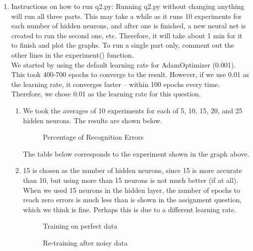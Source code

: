 \documentclass[11pt]{article}
\begin{document}
\begin{enumerate}
\pagebreak
\item Instructions on how to run q2.py:\newline
\newline
Running q2.py without changing anything will run all three parts. This may take a while as it runs 10 experiments for each number of hidden neurons, and after one is finished, a new neural net is created to run the second one, etc. Therefore, it will take about 1 min for it to finish and plot the graphs. To run a single part only, comment out the other lines in the experiment() function.\\
We started by using the default learning rate for AdamOptimizer (0.001). This took 400-700 epochs to converge to the result. However, if we use 0.01 as the learning rate, it converges faster -- within 100 epochs every time. Therefore, we chose 0.01 as the learning rate for this question.\\

% 
\begin{enumerate}
\item We took the averages of 10 experiments for each of 5, 10, 15, 20, and 25 hidden neurons. The results are shown below.\newline

\begin{figure}[h!]
    \centering
        \caption{Percentage of Recognition Errors}
\end{figure}

The table below corresponds to the experiment shown in the graph above.\newline
%

\item 15 is chosen as the number of hidden neurons, since 15 is more accurate than 10, but using more than 15 neurons is not much better (if at all). When we used 15 neurons in the hidden layer, the number of epochs to reach zero errors is much less than is shown in the assignment question, which we think is fine. Perhaps this is due to a different learning rate.\\
\begin{figure}[h!]
    \centering
    \begin{minipage}{0.45\textwidth}
    	\centering
        \caption{Training on perfect data}
    \end{minipage}\hfill
    \begin{minipage}{0.45\textwidth}
    	\centering
         \caption{Re-training after noisy data}
    \end{minipage}\hfill
\end{figure}


\end{enumerate}
\end{enumerate}
\end{document}
